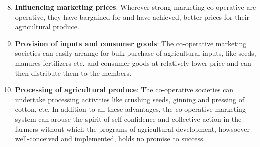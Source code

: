 \documentclass[12pt,ignorenonframetext,aspectratio=169]{beamer}
\providecommand{\tightlist}{%
  \setlength{\itemsep}{0pt}\setlength{\parskip}{0pt}}
\begin{document}
\begin{frame}{}
\protect\hypertarget{section-3}{}
\begin{enumerate}
\setcounter{enumi}{7}
\tightlist
\item
  \textbf{Influencing marketing prices}: Wherever strong marketing
  co-operative are operative, they have bargained for and have achieved,
  better prices for their agricultural produce.
\item
  \textbf{Provision of inputs and consumer goods}: The co-operative
  marketing societies can easily arrange for bulk purchase of
  agricultural inputs, like seeds, manures fertilizers etc. and consumer
  goods at relatively lower price and can then distribute them to the
  members.
\item
  \textbf{Processing of agricultural produce}: The co-operative
  societies can undertake processing activities like crushing seeds,
  ginning and pressing of cotton, etc. In addition to all these
  advantages, the co-operative marketing system can arouse the spirit of
  self-confidence and collective action in the farmers without which the
  programs of agricultural development, howsoever well-conceived and
  implemented, holds no promise to success.
\end{enumerate}
\end{frame}
\end{document}
